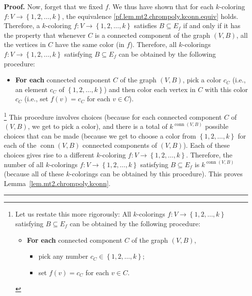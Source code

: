 \documentclass[numbers=enddot,12pt,final,onecolumn,notitlepage]{scrartcl}%
\theoremstyle{definition}
\newenvironment{proof}[1][Proof]{\noindent\textbf{#1.} }{\ \rule{0.5em}{0.5em}}
\newcommand{\conn}{\operatorname{conn}}
\newcommand{\set}[1]{\left\{ #1 \right\}}
\newcommand{\tup}[1]{\left( #1 \right)}
\begin{document}
\begin{proof}
Now, forget that we fixed $f$.
We thus have shown that for each $k$-coloring
$f : V \to \set{1, 2, \ldots, k}$, the equivalence
\eqref{pf.lem.mt2.chrompoly.kconn.equiv} holds.
Therefore, a $k$-coloring
$f : V \to \set{1, 2, \ldots, k} $ satisfies $B\subseteq E_f $
if and only if it has the property that whenever $C$ is a connected component
of the graph $ \tup{V, B} $, all the vertices in $C$ have the same
color (in $f$). Therefore, all $k$-colorings $f:V\rightarrow\left\{
1,2,\ldots,k\right\}  $ satisfying $B\subseteq E_f $ can be obtained by the
following procedure:

\begin{itemize}
\item \textbf{For each} connected component $C$ of the graph $\left(
V,B\right)  $, pick a color $c_{C}$ (i.e., an element $c_{C}$ of $\left\{
1,2,\ldots,k\right\}  $) and then color each vertex in $C$ with this color
$c_{C}$ (i.e., set $f\left(  v\right)  =c_{C}$ for each $v\in C$).
\end{itemize}

\footnote{Let us restate this more rigorously: All $k$-colorings
$f:V \to \set{1, 2, \ldots, k} $ satisfying $B\subseteq E_f $
can be obtained by the following procedure:
\par
\begin{itemize}
\item \textbf{For each} connected component $C$ of the graph $\left(
V,B\right)  $,
\par
\begin{itemize}
\item pick any number $c_C \in \set{1, 2, \ldots, k}$;
\par
\item set $f \tup{v} = c_C$ for each $v \in C$.
\end{itemize}
\end{itemize}
}
This procedure involves choices (because for each connected component
$C$ of $\tup{V, B}$, we get to pick a color), and there is a total of
$k^{ \conn  \tup{V, B} }$ possible choices that can be
made (because we get to choose a color from $\set{1, 2, \ldots, k}$
for each of the $ \conn  \tup{V, B} $ connected
components of $ \tup{V, B} $).
Each of these choices gives rise to a
different $k$-coloring $f : V \to \set{1, 2, \ldots, k} $.
Therefore, the number of all $k$-colorings
$f : V \to \set{1, 2, \ldots, k}$ satisfying $B \subseteq E_f$ is
$k^{ \conn  \tup{V, B} }$ (because all of these
$k$-colorings can be obtained by this procedure).
This proves Lemma~\ref{lem.mt2.chrompoly.kconn}.
\end{proof}
\end{document}
